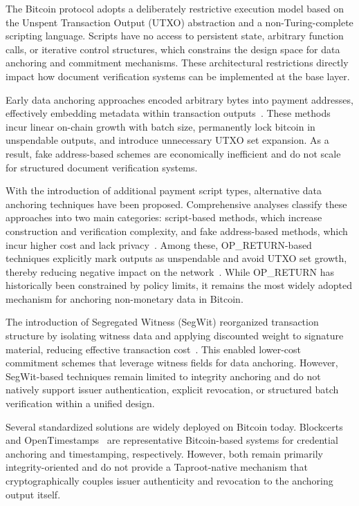 \documentclass{IEEEoj}
\begin{document}
The Bitcoin protocol adopts a deliberately restrictive execution model based on the Unspent Transaction Output (UTXO) abstraction and a non-Turing-complete scripting language.
Scripts have no access to persistent state, arbitrary function calls, or iterative control structures, which constrains the design space for data anchoring and commitment mechanisms.
These architectural restrictions directly impact how document verification systems can be implemented at the base layer.

Early data anchoring approaches encoded arbitrary bytes into payment addresses, effectively embedding metadata within transaction outputs~\cite{Gao2017Decentralized}.
These methods incur linear on-chain growth with batch size, permanently lock bitcoin in unspendable outputs, and introduce unnecessary UTXO set expansion.
As a result, fake address-based schemes are economically inefficient and do not scale for structured document verification systems.

With the introduction of additional payment script types, alternative data anchoring techniques have been proposed.
Comprehensive analyses classify these approaches into two main categories: script-based methods, which increase construction and verification complexity, and fake address-based methods, which incur higher cost and lack privacy~\cite{Bartoletti2019BitcoinMetadata}.
Among these, OP\_RETURN-based techniques explicitly mark outputs as unspendable and avoid UTXO set growth, thereby reducing negative impact on the network~\cite{Strehle2020DominatingOPReturns}.
While OP\_RETURN has historically been constrained by policy limits, it remains the most widely adopted mechanism for anchoring non-monetary data in Bitcoin.

The introduction of Segregated Witness (SegWit) reorganized transaction structure by isolating witness data and applying discounted weight to signature material, reducing effective transaction cost~\cite{Kedziora2022AnalysisSegWit}.
This enabled lower-cost commitment schemes that leverage witness fields for data anchoring.
However, SegWit-based techniques remain limited to integrity anchoring and do not natively support issuer authentication, explicit revocation, or structured batch verification within a unified design.

Several standardized solutions are widely deployed on Bitcoin today.
Blockcerts~\cite{Blockcerts} and OpenTimestamps~\cite{OpenTimestamps} are representative Bitcoin-based systems for credential anchoring and timestamping, respectively. 
However, both remain primarily integrity-oriented and do not provide a Taproot-native mechanism that cryptographically couples issuer authenticity and revocation to the anchoring output itself.
\end{document}
